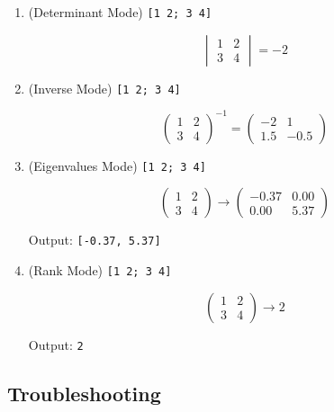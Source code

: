 \documentclass{article}
\begin{document}
\begin{enumerate}
\item (Determinant Mode) \texttt{[1\ 2;\ 3\ 4]}

\[
\begin{vmatrix}
   1 & 2 \\
   3 & 4
\end{vmatrix} = -2
\]

\hfill

\item (Inverse Mode) \texttt{[1\ 2;\ 3\ 4]}

\[
\begin{pmatrix}
   1 & 2 \\
   3 & 4
\end{pmatrix}^{-1} = \begin{pmatrix}
   -2 & 1 \\
   1.5 & -0.5
\end{pmatrix}
\]

\hfill

\item (Eigenvalues Mode) \texttt{[1\ 2;\ 3\ 4]}

\[
\begin{pmatrix}
   1 & 2 \\
   3 & 4
\end{pmatrix} \rightarrow \begin{pmatrix}
   -0.37 & 0.00 \\
   0.00 & 5.37
\end{pmatrix}
\]

Output: \texttt{[-0.37,\ 5.37]}

\hfill

\item (Rank Mode) \texttt{[1\ 2;\ 3\ 4]}

\[
\begin{pmatrix}
   1 & 2 \\
   3 & 4
\end{pmatrix} \rightarrow 2
\]

Output: \texttt{2}
\end{enumerate}

\newpage

\subsection{Troubleshooting}
\end{document}
